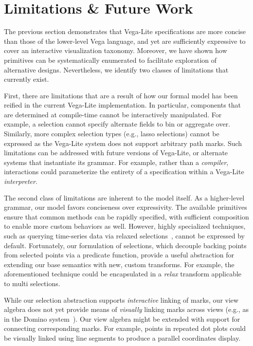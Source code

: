 \section{Limitations \& Future Work}
\label{sec:vl:conclusion}

The previous section demonstrates that Vega-Lite specifications are more concise
than those of the lower-level Vega language, and yet are sufficiently expressive
to cover an interactive visualization taxonomy. Moreover, we have shown how
primitives can be systematically enumerated to facilitate exploration of
alternative designs. Nevertheless, we identify two classes of limitations that
currently exist.

First, there are limitations that are a result of how our formal model has been
reified in the current Vega-Lite implementation. In particular, components that
are determined at compile-time cannot be interactively manipulated. For example,
a selection cannot specify alternate fields to bin or aggregate over. Similarly,
more complex selection types (e.g., lasso selections) cannot be expressed as the
Vega-Lite system does not support arbitrary path marks. Such limitations can be
addressed with future versions of Vega-Lite, or alternate systems that
instantiate its grammar. For example, rather than a \emph{compiler},
interactions could parameterize the entirety of a specification within a
Vega-Lite \emph{interpreter}.

The second class of limitations are inherent to the model itself. As a
higher-level grammar, our model favors conciseness over expressivity. The
available primitives ensure that common methods can be rapidly specified, with
sufficient composition to enable more custom behaviors as well. However, highly
specialized techniques, such as querying time-series data via relaxed
selections~\cite{holz:relaxed}, cannot be expressed by default. Fortunately, our
formulation of selections, which decouple backing points from selected points
via a predicate function, provide a useful abstraction for extending our base
semantics with new, custom transforms. For example, the aforementioned technique
could be encapsulated in a \emph{relax} transform applicable to multi
selections.

While our selection abstraction supports \emph{interactive} linking of marks,
our view algebra does not yet provide means of \emph{visually} linking marks
across views (e.g., as in the Domino system~\cite{gratzl:domino}). Our view
algebra might be extended with support for connecting corresponding marks. For
example, points in repeated dot plots could be visually linked using line
segments to produce a parallel coordinates display.

